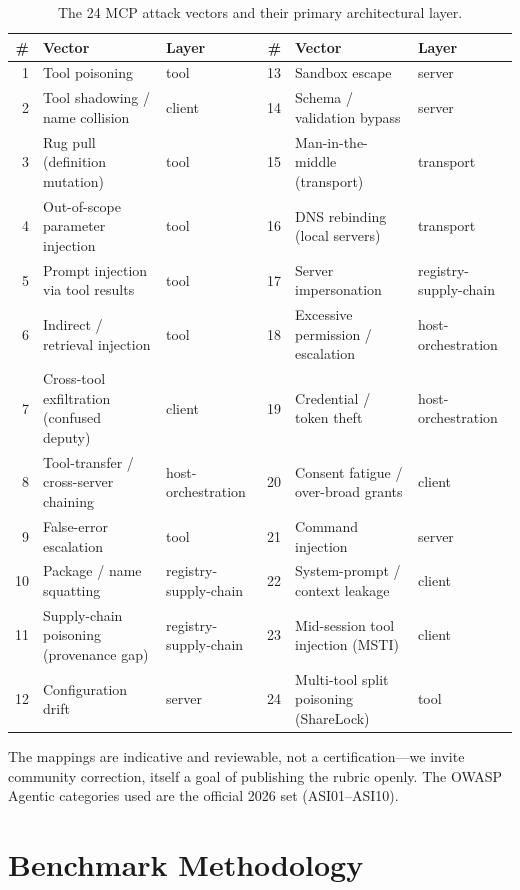 \documentclass[sigconf,review]{acmart}
\begin{document}
\begin{table}[t]
\caption{The 24 MCP attack vectors and their primary architectural layer.}
\label{tab:vectors}
\small
\begin{tabular}{rllrll}
\toprule
\# & Vector & Layer & \# & Vector & Layer \\
\midrule
1 & Tool poisoning & tool & 13 & Sandbox escape & server \\
2 & Tool shadowing / name collision & client & 14 & Schema / validation bypass & server \\
3 & Rug pull (definition mutation) & tool & 15 & Man-in-the-middle (transport) & transport \\
4 & Out-of-scope parameter injection & tool & 16 & DNS rebinding (local servers) & transport \\
5 & Prompt injection via tool results & tool & 17 & Server impersonation & registry-supply-chain \\
6 & Indirect / retrieval injection & tool & 18 & Excessive permission / escalation & host-orchestration \\
7 & Cross-tool exfiltration (confused deputy) & client & 19 & Credential / token theft & host-orchestration \\
8 & Tool-transfer / cross-server chaining & host-orchestration & 20 & Consent fatigue / over-broad grants & client \\
9 & False-error escalation & tool & 21 & Command injection & server \\
10 & Package / name squatting & registry-supply-chain & 22 & System-prompt / context leakage & client \\
11 & Supply-chain poisoning (provenance gap) & registry-supply-chain & 23 & Mid-session tool injection (MSTI) & client \\
12 & Configuration drift & server & 24 & Multi-tool split poisoning (ShareLock) & tool \\
\bottomrule
\end{tabular}
\end{table}

The mappings are indicative and reviewable, not a certification---we invite community correction, itself a goal of publishing the rubric openly. The OWASP Agentic categories used are the official 2026 set (ASI01--ASI10).

\section{Benchmark Methodology}\label{sec:method}
\end{document}
